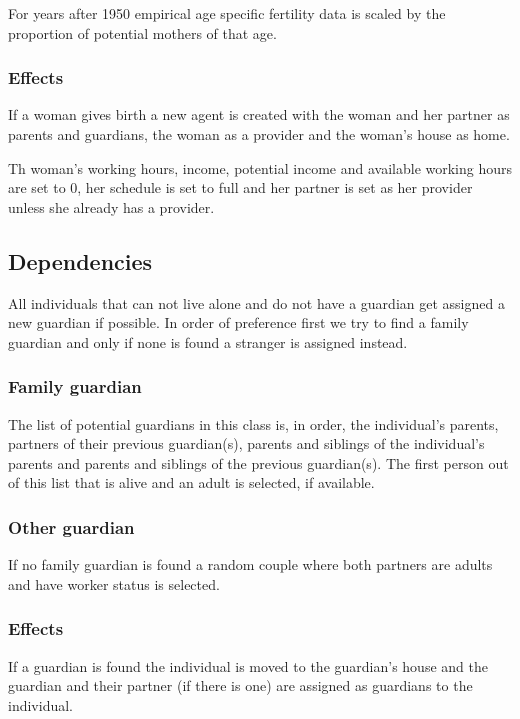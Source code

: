 \documentclass{article}
\begin{document}
For years after 1950 empirical age specific fertility data is scaled by the proportion of potential mothers of that age.

\subsubsection*{Effects}

If a woman gives birth a new agent is created with the woman and
her partner as parents and guardians, the woman as a provider and the woman's house as home. 

Th woman's working hours, income, potential income and available working hours are set to 0, her schedule is set to full and her partner is set as her provider unless she already has a provider.


\subsection{Dependencies} 

All individuals that can not live alone and do not have a guardian get assigned a new guardian if possible. In order of preference first we try to find a family guardian and only if none is found a stranger is assigned instead.

\subsubsection*{Family guardian}

The list of potential guardians in this class is, in order, the individual's parents, partners of their previous guardian(s), parents and siblings of the individual's parents and parents and siblings of the previous guardian(s). The first person out of this list that is alive and an adult is selected, if available.

\subsubsection*{Other guardian}

If no family guardian is found a random couple where both partners are adults and have worker status is selected.

\subsubsection*{Effects}

If a guardian is found the individual is moved to the guardian's house and the guardian and their partner (if there is one) are assigned as guardians to the individual.
\end{document}
